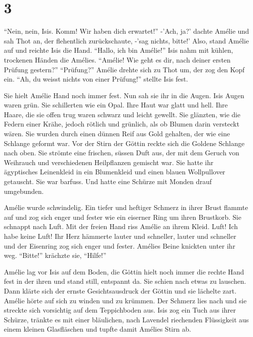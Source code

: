 \documentclass[11pt,titlepage,a5paper]{book}
\begin{document}
\section*{3}
 
"`Nein, nein, Isis. Komm! Wir haben dich erwartet!"' -'Ach, ja?' dachte Amélie und sah Thot an, der flehentlich zurückschaute, -'sag nichts, bitte!' Also, stand Amélie auf und reichte Isis die Hand. "`Hallo, ich bin Amélie!"' Isis nahm mit kühlen, trockenen Händen die Amélies. "`Amélie! Wie geht es dir, nach deiner ersten Prüfung gestern?"' "`Prüfung?"' Amélie drehte sich zu Thot um, der zog den Kopf ein. "`Ah, du weisst nichts von einer Prüfung!"' stellte Isis fest. 

Sie hielt Amélie Hand noch immer fest. Nun sah sie ihr in die Augen. Isis Augen waren grün. Sie schillerten wie ein Opal. Ihre Haut war glatt und hell. Ihre Haare, die sie offen trug waren schwarz und leicht gewellt. Sie glänzten, wie die Federn einer Krähe, jedoch rötlich und grünlich, als ob Blumen darin versteckt wären. Sie wurden durch einen dünnen Reif aus Gold gehalten, der wie eine Schlange geformt war. Vor der Stirn der Göttin reckte sich die Goldene Schlange nach oben. Sie strömte eine frischen, süssen Duft aus, der mit dem Geruch von Weihrauch und verschiedenen Heilpflanzen gemischt war. Sie hatte ihr ägyptisches Leinenkleid in ein Blumenkleid und einen blauen Wollpullover getauscht. Sie war barfuss. Und hatte eine Schürze mit Monden drauf umgebunden.

Amélie wurde schwindelig. Ein tiefer und heftiger Schmerz in ihrer Brust flammte auf und zog sich enger und fester wie ein eiserner Ring um ihren Brustkorb. Sie schnappt nach Luft. Mit der freien Hand riss Amélie an ihrem Kleid. Luft! Ich habe keine Luft! Ihr Herz hämmerte lauter und schneller, lauter und schneller und der Eisenring zog sich enger und fester. Amélies Beine knickten unter ihr weg. "`Bitte!"' krächzte sie, "`Hilfe!"' 

Amélie lag vor Isis auf dem Boden, die Göttin hielt noch immer die rechte Hand fest in der ihren und stand still, entspannt da. Sie schien nach etwas zu lauschen. Dann klärte sich der ernste Gesichtsausdruck der Göttin und sie lächelte zart. Amélie hörte auf sich zu winden und zu krümmen. Der Schmerz lies nach und sie streckte sich vorsichtig auf dem Teppichboden aus. Isis zog ein Tuch aus ihrer Schürze, tränkte es mit einer bläulichen, nach Lavendel riechenden Flüssigkeit aus einem kleinen Glasfläschen und tupfte damit Amélies Stirn ab.
\end{document}
